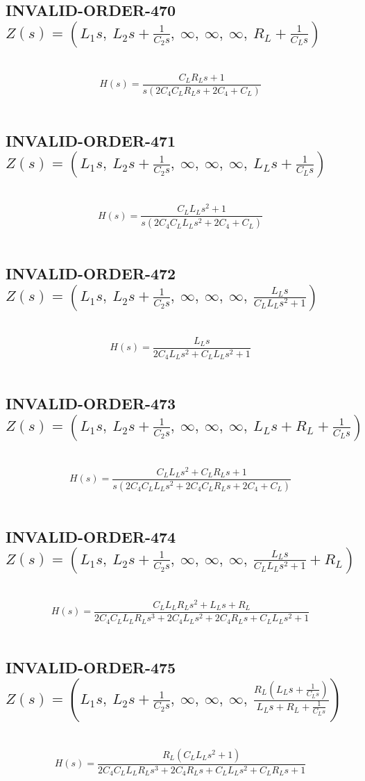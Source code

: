 \documentclass{article}
\begin{document}
\subsection{INVALID-ORDER-470 $Z(s) = \left( L_{1} s, \  L_{2} s + \frac{1}{C_{2} s}, \  \infty, \  \infty, \  \infty, \  R_{L} + \frac{1}{C_{L} s}\right)$ } \ 
\textbf{\[H(s) = \frac{C_{L} R_{L} s + 1}{s \left(2 C_{4} C_{L} R_{L} s + 2 C_{4} + C_{L}\right)}\] } \ 
\subsection{INVALID-ORDER-471 $Z(s) = \left( L_{1} s, \  L_{2} s + \frac{1}{C_{2} s}, \  \infty, \  \infty, \  \infty, \  L_{L} s + \frac{1}{C_{L} s}\right)$ } \ 
\textbf{\[H(s) = \frac{C_{L} L_{L} s^{2} + 1}{s \left(2 C_{4} C_{L} L_{L} s^{2} + 2 C_{4} + C_{L}\right)}\] } \ 
\subsection{INVALID-ORDER-472 $Z(s) = \left( L_{1} s, \  L_{2} s + \frac{1}{C_{2} s}, \  \infty, \  \infty, \  \infty, \  \frac{L_{L} s}{C_{L} L_{L} s^{2} + 1}\right)$ } \ 
\textbf{\[H(s) = \frac{L_{L} s}{2 C_{4} L_{L} s^{2} + C_{L} L_{L} s^{2} + 1}\] } \ 
\subsection{INVALID-ORDER-473 $Z(s) = \left( L_{1} s, \  L_{2} s + \frac{1}{C_{2} s}, \  \infty, \  \infty, \  \infty, \  L_{L} s + R_{L} + \frac{1}{C_{L} s}\right)$ } \ 
\textbf{\[H(s) = \frac{C_{L} L_{L} s^{2} + C_{L} R_{L} s + 1}{s \left(2 C_{4} C_{L} L_{L} s^{2} + 2 C_{4} C_{L} R_{L} s + 2 C_{4} + C_{L}\right)}\] } \ 
\subsection{INVALID-ORDER-474 $Z(s) = \left( L_{1} s, \  L_{2} s + \frac{1}{C_{2} s}, \  \infty, \  \infty, \  \infty, \  \frac{L_{L} s}{C_{L} L_{L} s^{2} + 1} + R_{L}\right)$ } \ 
\textbf{\[H(s) = \frac{C_{L} L_{L} R_{L} s^{2} + L_{L} s + R_{L}}{2 C_{4} C_{L} L_{L} R_{L} s^{3} + 2 C_{4} L_{L} s^{2} + 2 C_{4} R_{L} s + C_{L} L_{L} s^{2} + 1}\] } \ 
\subsection{INVALID-ORDER-475 $Z(s) = \left( L_{1} s, \  L_{2} s + \frac{1}{C_{2} s}, \  \infty, \  \infty, \  \infty, \  \frac{R_{L} \left(L_{L} s + \frac{1}{C_{L} s}\right)}{L_{L} s + R_{L} + \frac{1}{C_{L} s}}\right)$ } \ 
\textbf{\[H(s) = \frac{R_{L} \left(C_{L} L_{L} s^{2} + 1\right)}{2 C_{4} C_{L} L_{L} R_{L} s^{3} + 2 C_{4} R_{L} s + C_{L} L_{L} s^{2} + C_{L} R_{L} s + 1}\] } \ 
\end{document}
